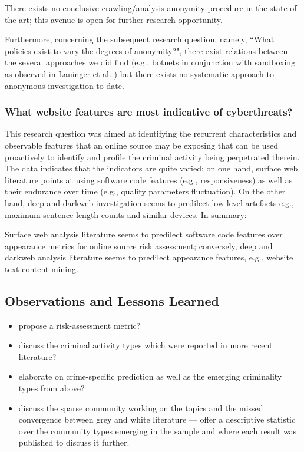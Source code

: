 \begin{framed}
There exists no conclusive crawling/analysis anonymity procedure in the state of the art; this avenue is open for further research opportunity.
\end{framed}

Furthermore, concerning the subsequent research question, namely, ``What policies exist to vary the degrees of anonymity?", there exist relations between the several approaches we did find (e.g., botnets in conjunction with sandboxing as observed in Lauinger et al. \cite{Lauinger2010HoneybotYM}) but there exists no systematic approach to anonymous investigation to date.

\subsubsection{What website features are most indicative of cyberthreats?}

This research question was aimed at identifying the recurrent characteristics and observable features that an online source may be exposing that can be used proactively to identify and profile the criminal activity being perpetrated therein. The data indicates that the indicators are quite varied; on one hand, surface web literature points at using software code features (e.g., responsiveness) as well as their endurance over time (e.g., quality parameters fluctuation). On the other hand, deep and darkweb investigation seems to predilect low-level artefacts e.g., maximum sentence length counts and similar devices. In summary:

\begin{framed}
Surface web analysis literature seems to predilect software code features over appearance metrics for online source risk assessment; conversely, deep and darkweb analysis literature seems to predilect appearance features, e.g., website text content mining.
\end{framed}


\subsection{Observations and Lessons Learned}

\begin{itemize}
\item propose a risk-assessment metric?
\item discuss the criminal activity types which were reported in more recent literature?
\item elaborate on crime-specific prediction as well as the emerging criminality types from above?
\item discuss the sparse community working on the topics and the missed convergence between grey and white literature --- offer a descriptive statistic over the community types emerging in the sample and where each result was published to discuss it further.
\end{itemize}


